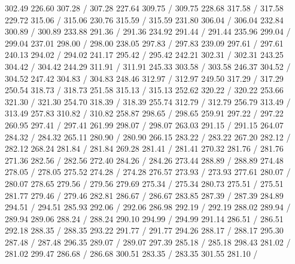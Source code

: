 { 302.49 226.60 307.28 /
 307.28 227.64 309.75 /
 309.75 228.68 317.58 /
 317.58 229.72 315.06 /
 315.06 230.76 315.59 /
 315.59 231.80 306.04 /
 306.04 232.84 300.89 /
 300.89 233.88 291.36 /
 291.36 234.92 291.44 /
 291.44 235.96 299.04 /
 299.04 237.01 298.00 /
 298.00 238.05 297.83 /
 297.83 239.09 297.61 /
 297.61 240.13 294.02 /
 294.02 241.17 295.42 /
 295.42 242.21 302.31 /
 302.31 243.25 304.42 /
 304.42 244.29 311.91 /
 311.91 245.33 303.58 /
 303.58 246.37 304.52 /
 304.52 247.42 304.83 /
 304.83 248.46 312.97 /
 312.97 249.50 317.29 /
 317.29 250.54 318.73 /
 318.73 251.58 315.13 /
 315.13 252.62 320.22 /
 320.22 253.66 321.30 /
 321.30 254.70 318.39 /
 318.39 255.74 312.79 /
 312.79 256.79 313.49 /
 313.49 257.83 310.82 /
 310.82 258.87 298.65 /
 298.65 259.91 297.22 /
 297.22 260.95 297.41 /
 297.41 261.99 298.07 /
 298.07 263.03 291.15 /
 291.15 264.07 284.32 /
 284.32 265.11 280.90 /
 280.90 266.15 283.22 /
 283.22 267.20 282.12 /
 282.12 268.24 281.84 /
 281.84 269.28 281.41 /
 281.41 270.32 281.76 /
 281.76 271.36 282.56 /
 282.56 272.40 284.26 /
 284.26 273.44 288.89 /
 288.89 274.48 278.05 /
 278.05 275.52 274.28 /
 274.28 276.57 273.93 /
 273.93 277.61 280.07 /
 280.07 278.65 279.56 /
 279.56 279.69 275.34 /
 275.34 280.73 275.51 /
 275.51 281.77 279.46 /
 279.46 282.81 286.67 /
 286.67 283.85 287.39 /
 287.39 284.89 294.51 /
 294.51 285.93 292.06 /
 292.06 286.98 292.19 /
 292.19 288.02 289.94 /
 289.94 289.06 288.24 /
 288.24 290.10 294.99 /
 294.99 291.14 286.51 /
 286.51 292.18 288.35 /
 288.35 293.22 291.77 /
 291.77 294.26 288.17 /
 288.17 295.30 287.48 /
 287.48 296.35 289.07 /
 289.07 297.39 285.18 /
 285.18 298.43 281.02 /
 281.02 299.47 286.68 /
 286.68 300.51 283.35 /
 283.35 301.55 281.10 /
}
